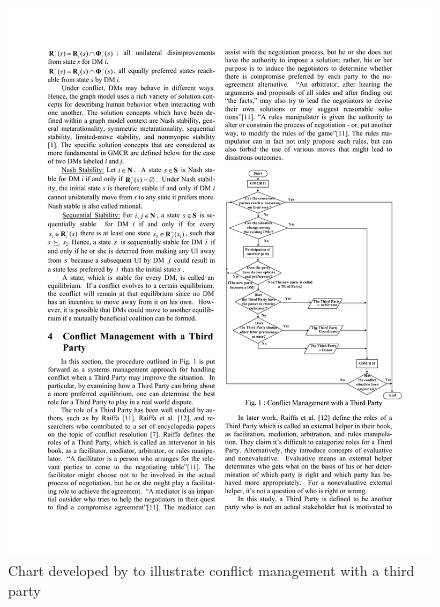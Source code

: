 \documentclass[letterpaper,12pt,titlepage,oneside,final]{book}
\begin{document}
\begin{center}
\begin{figure}[H]
\centering
\includegraphics[scale=1]{PDF-IMG/sakamato_flow.pdf}

\caption{Chart developed by \citet{sakamoto2005} to illustrate conflict management with a third party}

\label{fig:sakamato_flow}
\end{figure}
\end{center}
\end{document}
